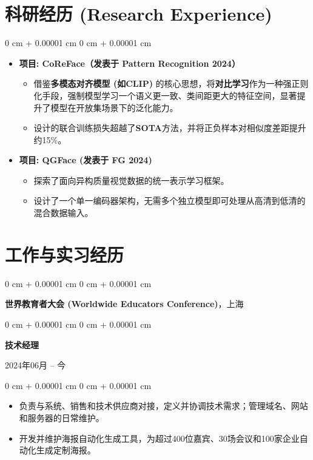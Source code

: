 \documentclass[10pt, letterpaper]{article}
\newenvironment{highlights}{
    \begin{itemize}[
        topsep=0.10 cm,
        parsep=0.10 cm,
        partopsep=0pt,
        itemsep=0pt,
        leftmargin=0 cm + 10pt
    ]
}{
    \end{itemize}
} %
\newenvironment{highlightsforbulletentries}{
    \begin{itemize}[
        topsep=0.10 cm,
        parsep=0.10 cm,
        partopsep=0pt,
        itemsep=0pt,
        leftmargin=10pt
    ]
}{
    \end{itemize}
} %
\newenvironment{onecolentry}{
    \begin{adjustwidth}{
        0 cm + 0.00001 cm
    }{
        0 cm + 0.00001 cm
    }
}{
    \end{adjustwidth}
} %
\newenvironment{twocolentry}[2][]{
    \onecolentry
    \def\secondColumn{#2}
    \setcolumnwidth{\fill, 4.5 cm}
    \begin{paracol}{2}
}{
    \switchcolumn \raggedleft \secondColumn
    \end{paracol}
    \endonecolentry
} %
\begin{document}
    \section{科研经历 (Research Experience)}

        \begin{onecolentry}
            
            \begin{highlights}
                \item \textbf{项目: CoReFace（发表于 Pattern Recognition 2024）}
                \begin{highlightsforbulletentries}
                    \item 借鉴\textbf{多模态对齐模型 (如CLIP)} 的核心思想，将\textbf{对比学习}作为一种强正则化手段，强制模型学习一个语义更一致、类间距更大的特征空间，显著提升了模型在开放集场景下的泛化能力。
                    \item 设计的联合训练损失超越了\textbf{SOTA}方法，并将正负样本对相似度差距提升约15\%。
                \end{highlightsforbulletentries}
                \item \textbf{项目: QGFace (发表于 FG 2024)}
                \begin{highlightsforbulletentries}
                    \item 探索了面向异构质量视觉数据的统一表示学习框架。
                    \item 设计了一个单一编码器架构，无需多个独立模型即可处理从高清到低清的混合数据输入。
                \end{highlightsforbulletentries}
            \end{highlights}
        \end{onecolentry}

\section{工作与实习经历}

    \begin{onecolentry}
        \large\textbf{世界教育者大会 (Worldwide Educators Conference)}，上海
    \end{onecolentry}
    \begin{twocolentry}{
        2024年06月 – 今
    }
        \textbf{技术经理}
    \end{twocolentry}
    \begin{onecolentry}
        \begin{highlights}
            \item 负责与系统、销售和技术供应商对接，定义并协调技术需求；管理域名、网站和服务器的日常维护。
            \item 开发并维护海报自动化生成工具，为超过400位嘉宾、30场会议和100家企业自动化生成定制海报。
        \end{highlights}
    \end{onecolentry}
    
\end{document}
